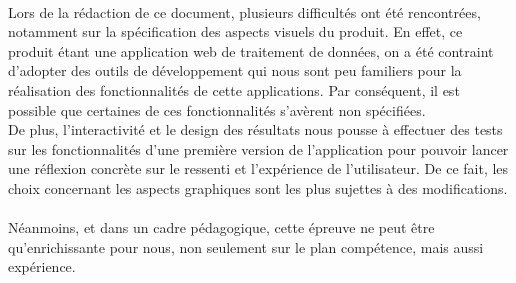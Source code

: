 		\paragraph{}Lors de la rédaction de ce document, plusieurs difficultés ont été rencontrées, notamment sur la spécification des aspects visuels du produit. En effet, ce produit étant une application web de traitement de données, on a été contraint d'adopter des outils de développement qui nous sont peu familiers pour la réalisation des fonctionnalités de cette applications. Par conséquent, il est possible que certaines de ces fonctionnalités s'avèrent non spécifiées.\\
		De plus, l'interactivité et le design des résultats nous pousse à effectuer des tests sur les fonctionnalités d'une première version de l'application pour pouvoir lancer une réflexion concrète sur le ressenti et l'expérience de l'utilisateur. De ce fait, les choix concernant les aspects graphiques sont les plus sujettes à des modifications.
		\paragraph{}Néanmoins, et dans un cadre pédagogique, cette épreuve ne peut être qu'enrichissante pour nous, non seulement sur le plan compétence, mais aussi expérience.
		

